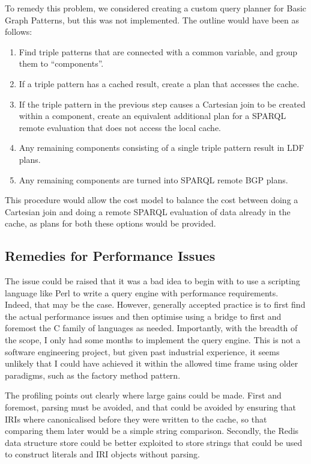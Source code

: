 To remedy this problem, we considered creating a custom query planner
for Basic Graph Patterns, but this was not implemented. The outline
would have been as follows:
\begin{enumerate}
\item Find triple patterns that are connected with a common variable,
  and group them to ``components''.
\item If a triple pattern has a cached result, create a plan that
  accesses the cache. 
\item If the triple pattern in the previous step causes a Cartesian
  join to be created within a component, create an equivalent
  additional plan for a SPARQL remote evaluation that does not access
  the local cache.
\item Any remaining components consisting of a single triple pattern
  result in LDF plans.
\item Any remaining components are turned into SPARQL remote BGP
  plans.
\end{enumerate}

This procedure would allow the cost model to balance the cost between
doing a Cartesian join and doing a remote SPARQL evaluation of data
already in the cache, as plans for both these options would be
provided.

\subsection{Remedies for Performance Issues}\label{sec:discussfail}

The issue could be raised that it was a bad idea to begin with to use a
scripting language like Perl to write a query engine with performance
requirements. Indeed, that may be the case. However, generally
accepted practice is to first find the actual performance issues and
then optimise using a bridge to first and foremost the C family of
languages as needed. Importantly, with the breadth of the scope, I only
had some months to implement the query engine. This is not a software
engineering project, but given past industrial experience, it seems
unlikely that I could have achieved it within the allowed time frame
using older paradigms, such as the factory method pattern.

The profiling points out clearly where large gains could be
made. First and foremost, parsing must be avoided, and that could be
avoided by ensuring that IRIs where canonicalised before they were
written to the cache, so that comparing them later would be a simple
string comparison. Secondly, the Redis data structure store could be
better exploited to store strings that could be used to construct  
literals and IRI objects without parsing. 

